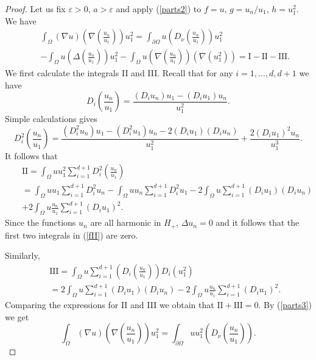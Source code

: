 \documentclass[11pt,leqno]{article}
\theoremstyle{definition}
\newcommand{\eps}{\varepsilon}
\numberwithin{equation}{section}
\begin{document}
\begin{proof}
Let us fix $\eps > 0$, $a > \eps$ and apply (\ref{parts2}) to $f = u$, $g = u_n/u_1$, $h =
u_1^2$.  We have 
\begin{eqnarray}
&& 
\label{parts3}
\int_{\Omega} (\nabla u) \left(\nabla \left(\frac{u_n}{u_1}\right)\right) u_1^2 = 
\int_{\partial \Omega} u \left(D_{\nu} \left(\frac{u_n}{u_1}\right)\right) u_1^2 
\\
&&
\nonumber
- \int_{\Omega} u \left( \Delta \left(\frac{u_n}{u_1}\right) \right) u_1^2 - 
\int_{\Omega} u \left( \nabla \left(\frac{u_n}{u_1}\right) \right) (\nabla (u_1^2)) = \text{I} - \text{II} - \text{III}.
\end{eqnarray}
We first  calculate the integrals II and III. Recall that for any $i = 1, \ldots, d, d + 1$ we
have
$$
D_i \left(\frac{u_n}{u_1}\right) = \frac{(D_i u_n) u_1 - (D_i u_1) u_n}{u_1^2}.
$$
Simple calculations gives 
$$
D_i^2 \left(\frac{u_n}{u_1}\right) = \frac{(D_i^2 u_n) u_1 - (D_i^2 u_1) u_n 
- 2 (D_i u_1) (D_i u_n)}{u_1^2} + \frac{2 (D_i u_1)^2 u_n}{u_1^3}.
$$
It follows that 
\begin{eqnarray}
&&
\nonumber
\text{II} = 
\int_{\Omega} u u_1^2 \sum_{i = 1}^{d + 1} D_i^2 \left(\frac{u_n}{u_1}\right) 
\\
&&
\label{fII}
= \int_{\Omega} u u_1 \sum_{i = 1}^{d + 1} D_i^2 u_n
-  \int_{\Omega} u u_n \sum_{i = 1}^{d + 1} D_i^2 u_1
- 2 \int_{\Omega} u  \sum_{i = 1}^{d + 1} (D_i u_1) (D_i u_n)
\\
&&
\nonumber
+ 2 \int_{\Omega} u \frac{u_n}{u_1} \sum_{i = 1}^{d + 1} (D_i u_1)^2.
\end{eqnarray}
Since  the functions $u_n$  are all harmonic in $H_+$, $\Delta u_n = 0$ and it follows 
that the first two integrals in  (\ref{fII}) are zero.


Similarly, 
\begin{eqnarray*}
&&
\text{III} = 
\int_{\Omega} u  \sum_{i = 1}^{d + 1} \left( D_i \left(\frac{u_n}{u_1}\right) \right)
D_i(u_1^2) 
\\
&&
=  2 \int_{\Omega} u  \sum_{i = 1}^{d + 1} (D_i u_1) (D_i u_n)
- 2 \int_{\Omega} u \frac{u_n}{u_1} \sum_{i = 1}^{d + 1} (D_i u_1)^2.
\end{eqnarray*}
Comparing the expressions for II and III we obtain that $\text{II} + \text{III} = 0$.
By (\ref{parts3}) we get
\begin{equation}
\label{secondf}
\int_{\Omega} (\nabla u) \left(\nabla \left(\frac{u_n}{u_1}\right)\right) u_1^2 = 
\int_{\partial \Omega} u u_1^2 \left(D_{\nu} \left(\frac{u_n}{u_1}\right)\right). 
\end{equation}


\end{proof}
\end{document}
